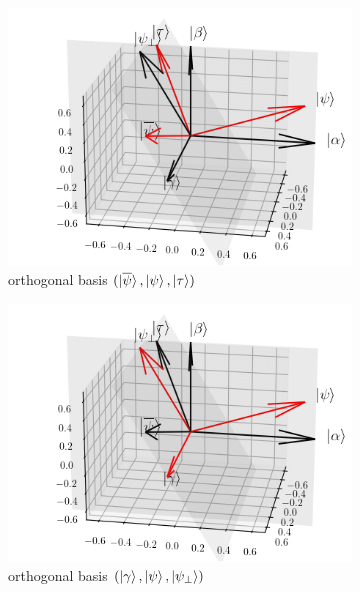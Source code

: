 \documentclass[a4paper,10pt]{book}
\numberwithin{equation}{section}
\begin{document}
\begin{figure}[h]
    \centering
    \begin{subfigure}[b]{0.33\columnwidth}
        \includegraphics[width=\columnwidth]{figures/basic_3.png}
        \caption{orthogonal basis $(\ket{\overline{\psi}},\ket{\psi},\ket{\tau})$}
    \end{subfigure}
    \begin{subfigure}[b]{0.33\columnwidth}
        \includegraphics[width=\columnwidth]{figures/basic_2.png}
        \caption{orthogonal basis $(\ket{\gamma},\ket{\psi},\ket{\psi_{\perp}})$}
    \end{subfigure}
    \begin{subfigure}[b]{0.33\columnwidth}

\end{subfigure}
\end{figure}
\end{document}
